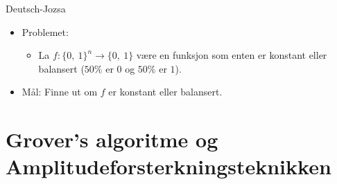 \documentclass[norsk]{beamer}
\begin{document}
	\begin{frame}{Deutsch-Jozsa}
		\begin{itemize}
			\item Problemet:
			\begin{itemize}
				\item La $f : \{0,\ 1\}^n \rightarrow \{0,\ 1\}$ være en funksjon som enten er konstant eller balansert ($50\%$ er $0$ og $50\%$ er $1$).
			\end{itemize}
			\item Mål: Finne ut om $f$ er konstant eller balansert.
			
			
		\end{itemize}
	\end{frame}

\section{Grover's algoritme og Amplitudeforsterkningsteknikken}
\end{document}
